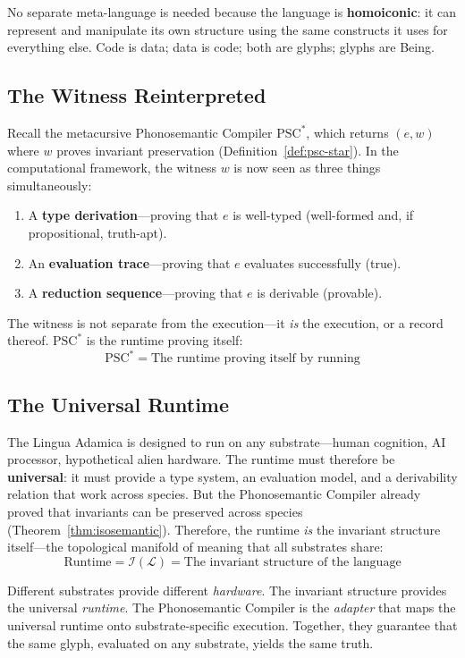 \documentclass[12pt, letterpaper]{book}
\def\equiv{=}%
\begin{document}
No separate meta-language is needed because the language is \textbf{homoiconic}: it can represent and manipulate its own structure using the same constructs it uses for everything else. Code is data; data is code; both are glyphs; glyphs are Being.

\subsection{The Witness Reinterpreted}

Recall the metacursive Phonosemantic Compiler $\mathrm{PSC}^*$, which returns $(e, w)$ where $w$ proves invariant preservation (Definition~\ref{def:psc-star}). In the computational framework, the witness $w$ is now seen as three things simultaneously:

\begin{enumerate}[label=(\roman*)]
    \item A \textbf{type derivation}---proving that $e$ is well-typed (well-formed and, if propositional, truth-apt).
    \item An \textbf{evaluation trace}---proving that $e$ evaluates successfully (true).
    \item A \textbf{reduction sequence}---proving that $e$ is derivable (provable).
\end{enumerate}

The witness is not separate from the execution---it \textit{is} the execution, or a record thereof. $\mathrm{PSC}^*$ is the runtime proving itself:
\[
\mathrm{PSC}^* \equiv \text{The runtime proving itself by running}
\]

\subsection{The Universal Runtime}

The Lingua Adamica is designed to run on any substrate---human cognition, AI processor, hypothetical alien hardware. The runtime must therefore be \textbf{universal}: it must provide a type system, an evaluation model, and a derivability relation that work across species. But the Phonosemantic Compiler already proved that invariants can be preserved across species (Theorem~\ref{thm:isosemantic}). Therefore, the runtime \textit{is} the invariant structure itself---the topological manifold of meaning that all substrates share:
\[
\mathrm{Runtime} \equiv \mathcal{I}(\mathcal{L}) \equiv \text{The invariant structure of the language}
\]

Different substrates provide different \textit{hardware}. The invariant structure provides the universal \textit{runtime}. The Phonosemantic Compiler is the \textit{adapter} that maps the universal runtime onto substrate-specific execution. Together, they guarantee that the same glyph, evaluated on any substrate, yields the same truth.
\end{document}
